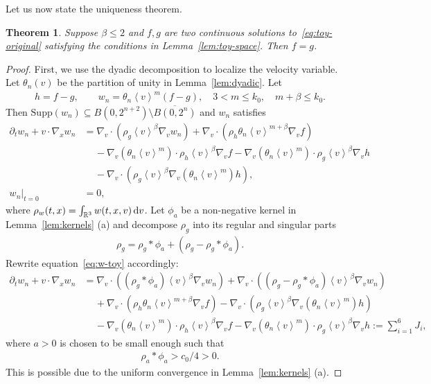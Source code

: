 \documentclass[11pt,american, reqno]{amsart}
\numberwithin{equation}{section}
\newtheorem{theorem}{Theorem}[section]
\newcommand{\R}{\mathbb R}
\newcommand{\1}{\mathds{1}}
\newcommand{\del}{\partial}
\newcommand{\dv}{\, {\rm d} v}
\newcommand{\vpran}[1]{\left(#1\right)}
\newcommand{\nn}{\nonumber}
\newcommand{\vint}[1]{\left\langle#1\right\rangle}
\numberwithin{equation}{section}
\begin{document}
Let us now state the uniqueness theorem.
\begin{theorem}  \label{thm:unique-w-toy}
Suppose $\beta \leq 2$ and $f, g$ are two continuous solutions to~\eqref{eq:toy-original} satisfying the conditions in Lemma~\ref{lem:toy-space}. 
Then $f = g$. 
\end{theorem}

 

\begin{proof}
First, we use the dyadic decomposition to localize the velocity variable. Let $\theta_n(v)$ be the partition of unity in Lemma~\ref{lem:dyadic}. Let
\begin{align} \label{def:differences}
 h = f - g, 
\qquad 
 w_n = \theta_n\vint{v}^m (f - g), 
\quad
 3 < m \leq k_0,
\quad 
 m + \beta \leq k_0.
\end{align}
Then $\text{Supp}(w_n) \subseteq B(0, 2^{n+2})\setminus \overline{B(0, 2^n)}$ and $w_n$ satisfies
\begin{align} \label{eq:w-toy}
  \del_t w_n + v \cdot \nabla_x w_n 
&= \nabla_v \cdot \vpran{\rho_g \vint{v}^\beta \nabla_v w_n}
 + \nabla_v \cdot \vpran{\rho_h \theta_n \vint{v}^{m+\beta} \nabla_v f} \nn
\\
& \quad \,
 - \nabla_v \vpran{\theta_n \vint{v}^m}    \cdot \rho_h \vint{v}^\beta
   \nabla_v f
 - \nabla_v\vpran{\theta_n \vint{v}^m}    \cdot \rho_g \vint{v}^\beta
   \nabla_v h \nn
\\
& \quad \,
  - \nabla_v \cdot 
    \vpran{\rho_g \vint{v}^\beta
    \nabla_v\vpran{\theta_n \vint{v}^m} h},
\\
 w_n|_{t=0} & = 0,  \nn
\end{align}
where $\rho_w(t, x) =  \int_{\R^3} w(t, x, v) \dv$. Let $\phi_a$ be a non-negative kernel in Lemma~\ref{lem:kernels} (a) and decompose $\rho_g$ into its regular and singular parts
\begin{align*}
 \rho_g = \rho_g \ast \phi_a + (\rho_g - \rho_g \ast \phi_a). 
\end{align*}
Rewrite equation~\eqref{eq:w-toy} accordingly: 
\begin{align} \label{eq:w-toy-reg}
  \del_t w_n + v \cdot \nabla_x w_n 
&= \nabla_v \cdot \vpran{\vpran{\rho_g \ast \phi_a} \vint{v}^\beta \nabla_v w_n}
  + \nabla_v \cdot \vpran{\vpran{\rho_g - \rho_g \ast \phi_a} \vint{v}^\beta \nabla_v w_n} \nn
\\
& \quad \,
 + \nabla_v \cdot \vpran{\rho_h \theta_n \vint{v}^{m+\beta} \nabla_v f}
 - \nabla_v \cdot 
    \vpran{\rho_g \vint{v}^\beta
    \nabla_v\vpran{\theta_n \vint{v}^m} h} 
\\
& \quad \,
 - \nabla_v \vpran{\theta_n \vint{ v}^m}    \cdot \rho_h \vint{v}^\beta
   \nabla_v f
 - \nabla_v\vpran{\theta_n \vint{v}^m}    \cdot \rho_g \vint{v}^\beta
   \nabla_v h := \sum_{i=1}^6 J_i, \nn
\end{align}
where $a > 0$ is chosen to be small enough such that 
\begin{align} \label{cond:ellip}
 \rho_a \ast \phi_a > c_0/4 > 0.
\end{align}
This is possible due to the uniform convergence in Lemma~\ref{lem:kernels} (a). 


\end{proof}
\end{document}
